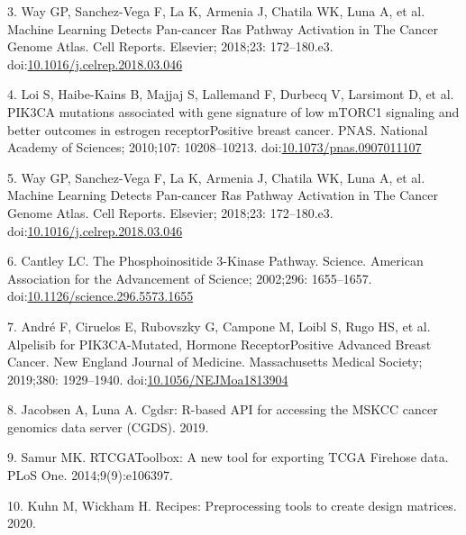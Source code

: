 \documentclass[10pt,letterpaper]{article}
\begin{document}
\leavevmode\hypertarget{ref-wayMachineLearningDetects2018}{}%
3. Way GP, Sanchez-Vega F, La K, Armenia J, Chatila WK, Luna A, et al.
Machine Learning Detects Pan-cancer Ras Pathway Activation in The Cancer
Genome Atlas. Cell Reports. Elsevier; 2018;23: 172--180.e3.
doi:\href{https://doi.org/10.1016/j.celrep.2018.03.046}{10.1016/j.celrep.2018.03.046}

\leavevmode\hypertarget{ref-loiPIK3CAMutationsAssociated2010}{}%
4. Loi S, Haibe-Kains B, Majjaj S, Lallemand F, Durbecq V, Larsimont D,
et al. PIK3CA mutations associated with gene signature of low mTORC1
signaling and better outcomes in estrogen receptorPositive breast
cancer. PNAS. National Academy of Sciences; 2010;107: 10208--10213.
doi:\href{https://doi.org/10.1073/pnas.0907011107}{10.1073/pnas.0907011107}

\leavevmode\hypertarget{ref-way_2018_machine_cellreports}{}%
5. Way GP, Sanchez-Vega F, La K, Armenia J, Chatila WK, Luna A, et al.
Machine Learning Detects Pan-cancer Ras Pathway Activation in The Cancer
Genome Atlas. Cell Reports. Elsevier; 2018;23: 172--180.e3.
doi:\href{https://doi.org/10.1016/j.celrep.2018.03.046}{10.1016/j.celrep.2018.03.046}

\leavevmode\hypertarget{ref-cantleyPhosphoinositide3KinasePathway2002}{}%
6. Cantley LC. The Phosphoinositide 3-Kinase Pathway. Science. American
Association for the Advancement of Science; 2002;296: 1655--1657.
doi:\href{https://doi.org/10.1126/science.296.5573.1655}{10.1126/science.296.5573.1655}

\leavevmode\hypertarget{ref-andre_2019_alpelisib_nengljmeda}{}%
7. André F, Ciruelos E, Rubovszky G, Campone M, Loibl S, Rugo HS, et al.
Alpelisib for PIK3CA-Mutated, Hormone ReceptorPositive Advanced Breast
Cancer. New England Journal of Medicine. Massachusetts Medical Society;
2019;380: 1929--1940.
doi:\href{https://doi.org/10.1056/NEJMoa1813904}{10.1056/NEJMoa1813904}

\leavevmode\hypertarget{ref-jacobsenCgdsrRbasedAPI2019}{}%
8. Jacobsen A, Luna A. Cgdsr: R-based API for accessing the MSKCC cancer
genomics data server (CGDS). 2019.

\leavevmode\hypertarget{ref-samurRTCGAToolboxNewTool2014}{}%
9. Samur MK. RTCGAToolbox: A new tool for exporting TCGA Firehose data.
PLoS One. 2014;9(9):e106397.

\leavevmode\hypertarget{ref-kuhnRecipesPreprocessingTools2020}{}%
10. Kuhn M, Wickham H. Recipes: Preprocessing tools to create design
matrices. 2020.
\end{document}
